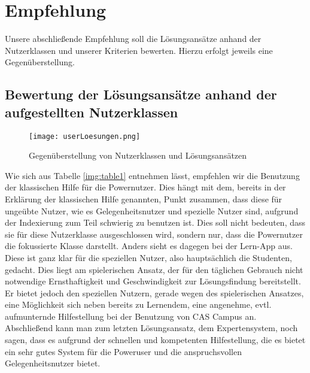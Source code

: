 \chapter{Empfehlung}
Unsere abschließende Empfehlung soll die Lösungsansätze anhand der Nutzerklassen und unserer Kriterien bewerten. Hierzu erfolgt jeweils eine Gegenüberstellung.
\section{Bewertung der Lösungsansätze anhand der aufgestellten Nutzerklassen}

\begin{figure}[ht]
\begin{center}
\texttt{[image: userLoesungen.png]}
\caption{Gegenüberstellung von Nutzerklassen und Lösungsansätzen}
\label{img1:table1}
\end{center}
\end{figure} 
Wie sich aus Tabelle \ref{img:table1} entnehmen lässt, empfehlen wir die Benutzung der klassischen Hilfe für die Powernutzer. Dies hängt mit dem, bereits in der Erklärung der klassischen Hilfe genannten, Punkt zusammen, dass diese für ungeübte Nutzer, wie es Gelegenheitsnutzer und spezielle Nutzer sind, aufgrund der Indexierung zum Teil schwierig zu benutzen ist. Dies soll nicht bedeuten, dass sie für diese Nutzerklasse ausgeschlossen wird, sondern nur, dass die Powernutzer die fokussierte Klasse darstellt. Anders sieht es dagegen bei der Lern-App aus. Diese ist ganz klar für die speziellen Nutzer, also hauptsächlich die Studenten, gedacht. Dies liegt am spielerischen Ansatz, der für den täglichen Gebrauch nicht notwendige Ernsthaftigkeit und Geschwindigkeit zur Lösungsfindung bereitstellt. Er bietet jedoch den speziellen Nutzern, gerade wegen des spielerischen Ansatzes, eine Möglichkeit sich neben bereits zu Lernendem, eine angenehme, evtl. aufmunternde Hilfestellung bei der Benutzung von CAS Campus an. Abschließend kann man zum letzten Lösungsansatz, dem Expertensystem, noch sagen, dass es aufgrund der schnellen und kompetenten Hilfestellung, die es bietet ein sehr gutes System für die Poweruser und die anspruchsvollen Gelegenheitsnutzer bietet.

